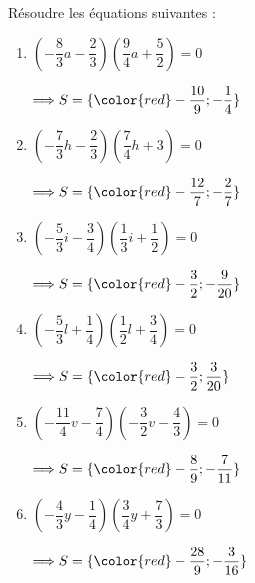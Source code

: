 \documentclass[convert={density=300,size=1080x800,outext=.png}]{standalone}
\begin{document}
Résoudre les équations suivantes :
                        \begin{multicols}{2}
                                \begin{enumerate}
                                        \item $(- \dfrac{8}{3}a- \dfrac{2}{3})(\dfrac{9}{4}a+\dfrac{5}{2})=0 $    
                            \begin{flushright}
                                    $\Longrightarrow S=\lbrace{\color{red} - \dfrac{10}{9};- \dfrac{1}{4}}\rbrace$
                            \end{flushright}
                                        \item $(- \dfrac{7}{3}h- \dfrac{2}{3})(\dfrac{7}{4}h+3)=0 $
                            \begin{flushright}
                                    $\Longrightarrow S=\lbrace{\color{red} - \dfrac{12}{7};- \dfrac{2}{7}}\rbrace$
                            \end{flushright}
                                        \item $(- \dfrac{5}{3}i- \dfrac{3}{4})(\dfrac{1}{3}i+\dfrac{1}{2})=0 $    
                            \begin{flushright}
                                    $\Longrightarrow S=\lbrace{\color{red} - \dfrac{3}{2};- \dfrac{9}{20}}\rbrace$
                            \end{flushright}
                                        \item $(- \dfrac{5}{3}l+\dfrac{1}{4})(\dfrac{1}{2}l+\dfrac{3}{4})=0 $     
                            \begin{flushright}
                                    $\Longrightarrow S=\lbrace{\color{red} - \dfrac{3}{2};\dfrac{3}{20}}\rbrace$
                            \end{flushright}
                                        \item $(- \dfrac{11}{4}v- \dfrac{7}{4})(- \dfrac{3}{2}v- \dfrac{4}{3})=0 $
                            \begin{flushright}
                                    $\Longrightarrow S=\lbrace{\color{red} - \dfrac{8}{9};- \dfrac{7}{11}}\rbrace$
                            \end{flushright}
                                        \item $(- \dfrac{4}{3}y- \dfrac{1}{4})(\dfrac{3}{4}y+\dfrac{7}{3})=0 $
                            \begin{flushright}
                                    $\Longrightarrow S=\lbrace{\color{red} - \dfrac{28}{9};- \dfrac{3}{16}}\rbrace$
                            \end{flushright}

                                \end{enumerate}
                        \end{multicols}
\end{document}

